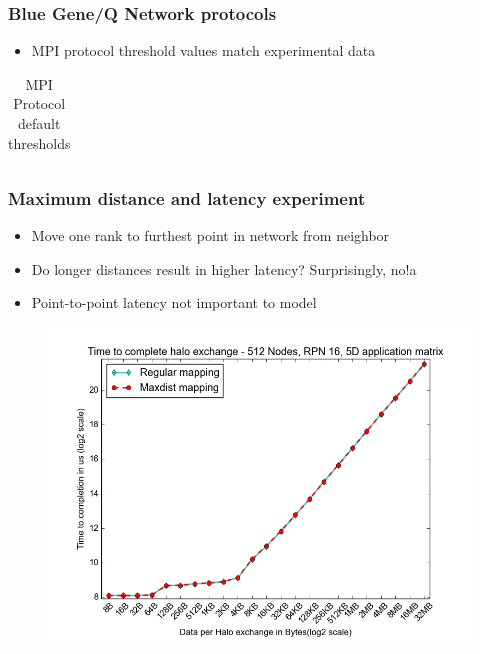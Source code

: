 \documentclass{beamer}
\begin{document}

\begin{frame}[fragile]
\frametitle{Blue Gene/Q Network protocols}
\begin{itemize}
    \item MPI protocol threshold values match experimental data
\end{itemize}
\begin{table}
  \caption{MPI Protocol default thresholds
    \label{table:bgq_protocols}}
  {\footnotesize
    \begin{tabular}{ | l | l | l | p{1.5cm} |}
    \hline 
    
    \end{tabular}
  }
\end{table}
\end{frame}

\begin{frame}
\frametitle{Maximum distance and latency experiment}
\begin{itemize}
    \item Move one rank to furthest point in network from neighbor
    \item Do longer distances result in higher latency? Surprisingly, no!a
    \item Point-to-point latency not important to model
\end{itemize}
\begin{figure}
\includegraphics[width=0.8\linewidth]{../regular_vs_maxdist.png}
\end{figure}
\end{frame}
\end{document}
